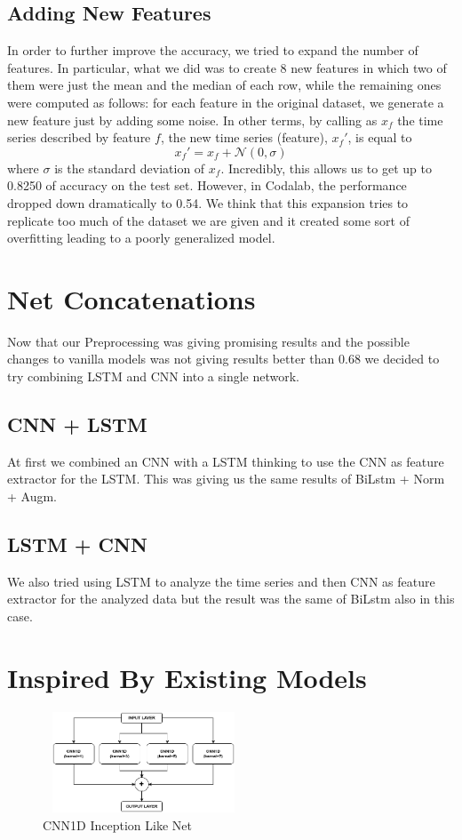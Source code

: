 \documentclass[11pt]{article}
\begin{document}
\subsection{Adding New Features}
In order to further improve the accuracy, we tried to expand the number of features. In particular, what we did was to create 8 new features in which two of them were just the mean and the median of each row, while the remaining ones were computed as follows: for each feature in the original dataset, we generate a new feature just by adding some noise. In other terms, by calling as $x_f$ the time series described by feature $f$, the new time series (feature), $x_f'$, is equal to
\begin{equation*}
    x_f' = x_f + \mathcal{N}(0, \sigma)
\end{equation*}
where $\sigma$ is the standard deviation of $x_f$. Incredibly, this allows us to get up to 0.8250 of accuracy on the test set. However, in Codalab, the performance dropped down dramatically to 0.54. We think that this expansion tries to replicate too much of the dataset we are given and it created some sort of overfitting leading to a poorly generalized model.
\section{Net Concatenations}
Now that our Preprocessing was giving promising results and the possible changes to vanilla models was not giving results better than 0.68
we decided to try combining LSTM and CNN into a single network.
\subsection{CNN + LSTM}
At first we combined an CNN with a LSTM thinking to use the CNN as feature extractor for the LSTM.
This was giving us the same results of BiLstm + Norm + Augm.
\subsection{LSTM + CNN}
We also tried using LSTM to analyze the time series and then CNN as feature extractor for the analyzed data
but the result was the same of BiLstm also in this case.

\section{Inspired By Existing Models}
\begin{figure}[h]
\centering
\includegraphics[width=6cm, height=3cm]{Inception}
\caption{CNN1D Inception Like Net}
\end{figure}
\end{document}
